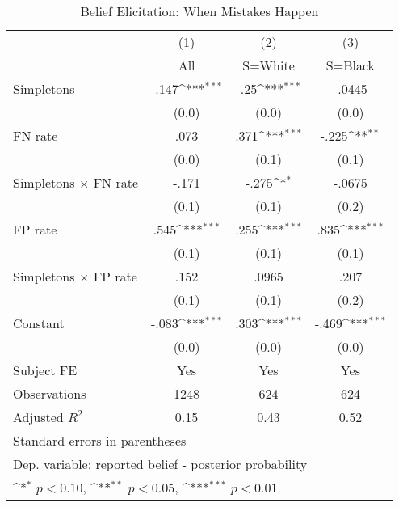\begin{table}[htbp]\centering
\def\sym#1{\ifmmode^{#1}\else\(^{#1}\)\fi}
\caption{Belief Elicitation: When Mistakes Happen}
\begin{tabular}{l*{3}{c}}
\hline\hline
                &\multicolumn{1}{c}{(1)}&\multicolumn{1}{c}{(2)}&\multicolumn{1}{c}{(3)}\\
                &\multicolumn{1}{c}{All}&\multicolumn{1}{c}{S=White}&\multicolumn{1}{c}{S=Black}\\
\hline
Simpletons      &    -.147\sym{***}&     -.25\sym{***}&   -.0445         \\
                &    (0.0)         &    (0.0)         &    (0.0)         \\
FN rate         &     .073         &     .371\sym{***}&    -.225\sym{**} \\
                &    (0.0)         &    (0.1)         &    (0.1)         \\
Simpletons $\times$ FN rate&    -.171         &    -.275\sym{*}  &   -.0675         \\
                &    (0.1)         &    (0.1)         &    (0.2)         \\
FP rate         &     .545\sym{***}&     .255\sym{***}&     .835\sym{***}\\
                &    (0.1)         &    (0.1)         &    (0.1)         \\
Simpletons $\times$ FP rate&     .152         &    .0965         &     .207         \\
                &    (0.1)         &    (0.1)         &    (0.2)         \\
Constant        &    -.083\sym{***}&     .303\sym{***}&    -.469\sym{***}\\
                &    (0.0)         &    (0.0)         &    (0.0)         \\
Subject FE      &      Yes         &      Yes         &      Yes         \\
\hline
Observations    &     1248         &      624         &      624         \\
Adjusted \(R^{2}\)&     0.15         &     0.43         &     0.52         \\
\hline\hline
\multicolumn{4}{l}{\footnotesize Standard errors in parentheses}\\
\multicolumn{4}{l}{\footnotesize Dep. variable: reported belief - posterior probability}\\
\multicolumn{4}{l}{\footnotesize \sym{*} \(p<0.10\), \sym{**} \(p<0.05\), \sym{***} \(p<0.01\)}\\
\end{tabular}
\end{table}
